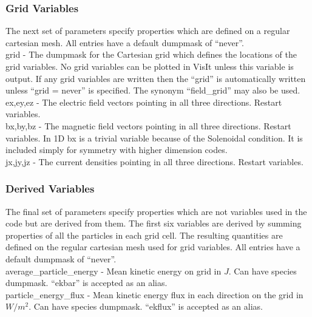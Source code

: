 
\subsubsection{Grid Variables}
The next set of parameters specify properties which are defined on a
regular cartesian mesh. All entries have a default
dumpmask of ``never''.\\

{\emphtext grid} - The dumpmask for the Cartesian grid which defines the
locations of the grid variables. No grid variables can be plotted in VisIt
unless this variable is output.
If any grid variables are written then the
``grid'' is automatically written unless ``grid = never''
is specified.
The synonym ``field\_grid'' may also be used.\\

{\emphtext ex,\;ey,\;ez} - The electric field vectors pointing in all three
directions. Restart variables.\\

{\emphtext bx,\;by,\;bz} - The magnetic field vectors pointing in all three
directions. Restart variables. In 1D bx is a trivial variable because of the
Solenoidal condition. It is included simply for symmetry with higher dimension
codes.\\

{\emphtext jx,\;jy,\;jz} - The current densities pointing in all three
directions. Restart variables.\\

\subsubsection{Derived Variables}
\label{sec:derived}
The final set of parameters specify properties which are not variables used
in the code but are derived from them. The first six variables are derived
by summing properties of all the particles in each grid cell. The resulting
quantities are defined on the regular cartesian mesh used for grid variables.
All entries have a default dumpmask of ``never''.\\

{\emphtext average\_particle\_energy} - Mean kinetic energy on grid in $J$. Can
have species dumpmask. ``ekbar'' is accepted as an alias.\\

{\emphtext particle\_energy\_flux} - Mean kinetic energy flux in each direction
on the grid in $W/m^2$. Can have species dumpmask. ``ekflux'' is accepted as an
alias.\\

